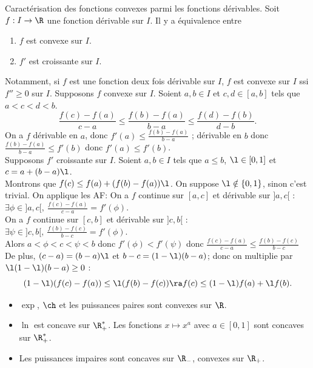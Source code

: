 \documentclass[11pt]{article}
\begin{document}
\begin{prop}{Caractérisation des fonctions convexes parmi les fonctions dérivables.}{}
    Soit $f:I\to\R$ une fonction dérivable sur $I$. Il y a équivalence entre
    \begin{enumerate}
        \item $f$ est convexe sur $I$.
        \item $f'$ est croissante sur $I$.
    \end{enumerate}
    Notamment, si $f$ est une fonction deux fois dérivable sur $I$, $f$ est convexe sur $I$ ssi $f''\geq0$ sur $I$.
    \tcblower
    \boxed{\ra} Supposons $f$ convexe sur $I$. Soient $a,b\in I$ et $c,d\in[a,b]$ tels que $a<c<d<b$.
    \begin{equation*}
        \frac{f(c)-f(a)}{c-a}\leq\frac{f(b)-f(a)}{b-a}\leq\frac{f(d)-f(b)}{d-b}.
    \end{equation*}
    On a $f$ dérivable en $a$, donc $f'(a)\leq\frac{f(b)-f(a)}{b-a}$ ; dérivable en $b$ donc $\frac{f(b)-f(a)}{b-a}\leq f'(b)$ donc $f'(a)\leq f'(b)$.\\
    \boxed{\la} Supposons $f'$ croissante sur $I$. Soient $a,b\in I$ tels que $a\leq b$, $\l \in[0,1]$ et $c=a+(b-a)\l$.\\
    Montrons que $f(c)\leq f(a)+(f(b)-f(a))\l$. On suppose $\l\notin\{0,1\}$, sinon c'est trivial. On applique les AF:
    On a $f$ continue sur $[a,c]$ et dérivable sur $]a,c[$ : $\exists \phi \in ]a,c[, ~ \frac{f(c)-f(a)}{c-a}=f'(\phi)$.\\
    On a $f$ continue sur $[c,b]$ et dérivable sur $]c,b[$ : $\exists \psi \in ]c,b[, ~ \frac{f(b)-f(c)}{b-c}=f'(\phi)$.\\
    Alors $a<\phi<c<\psi<b$ donc $f'(\phi)<f'(\psi)$ donc $\frac{f(c)-f(a)}{c-a}\leq\frac{f(b)-f(c)}{b-c}$\\
    De plus, $(c-a)=(b-a)\l$ et $b-c=(1-\l)(b-a)$; donc on multiplie par $\l(1-\l)(b-a)\geq0$ :
    \begin{equation*}
        (1-\l)(f(c)-f(a))\leq\l(f(b)-f(c)) \ra f(c) \leq (1-\l)f(a) + \l f(b).
    \end{equation*}
\end{prop}

\begin{ex}{}{}
    \begin{itemize}
        \item $\exp$, $\ch$ et les puissances paires sont convexes sur $\R$.
        \item $\ln$ est concave sur $\R_+^*$. Les fonctions $x\mapsto x^a$ avec $a\in[0,1]$ sont concaves sur $\R_+^*$.
        \item Les puissances impaires sont concaves sur $\R_-$, convexes sur $\R_+$.
    \end{itemize}
\end{ex}
\end{document}
